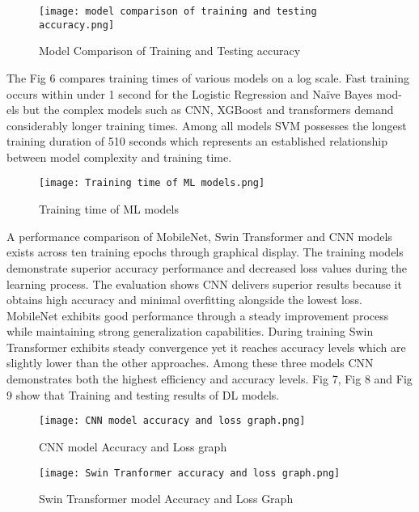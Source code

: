 \documentclass[runningheads]{llncs}
\begin{document}
\begin{figure}
    \centering
    \texttt{[image: model comparison of training and testing accuracy.png]}
    \caption{Model Comparison of Training and Testing accuracy}
    \label{fig:enter-label}
\end{figure}

The Fig 6 compares training times of various models on a log scale. Fast training occurs within under 1 second for the Logistic Regression and Naïve Bayes mod-els but the complex models such as CNN, XGBoost and transformers demand considerably longer training times. Among all models SVM possesses the longest training duration of 510 seconds which represents an established relationship between model complexity and training time.

\begin{figure}
    \centering
    \texttt{[image: Training time of ML models.png]}
    \caption{Training time of ML models}
    \label{fig:enter-label}
\end{figure}


A performance comparison of MobileNet, Swin Transformer and CNN models exists across ten training epochs through graphical display. The training models demonstrate superior accuracy performance and decreased loss values during the learning process. The evaluation shows CNN delivers superior results because it obtains high accuracy and minimal overfitting alongside the lowest loss. MobileNet exhibits good performance through a steady improvement process while maintaining strong generalization capabilities. During training Swin Transformer exhibits steady convergence yet it reaches accuracy levels which are slightly lower than the other approaches. Among these three models CNN demonstrates both the highest efficiency and accuracy levels. Fig 7, Fig 8 and Fig 9 show that Training and testing results of DL models.


\begin{figure}
    \centering
    \texttt{[image: CNN model accuracy and loss graph.png]}
    \caption{CNN model Accuracy and Loss graph}
    \label{fig:enter-label}
\end{figure}

\begin{figure}
    \centering
    \texttt{[image: Swin Tranformer accuracy and loss graph.png]}
    \caption{Swin Transformer model Accuracy and Loss Graph}
    \label{fig:enter-label}
\end{figure}
\end{document}
